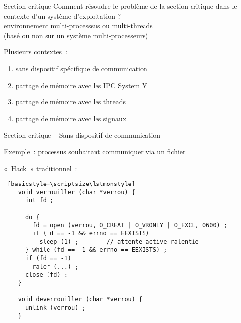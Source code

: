 

\begin {frame} {Section critique}
    Comment résoudre le problème de la section critique dans
    le contexte d'un système d'exploitation ? \\
    \implique environnement multi-processsus ou multi-threads \\
    (basé ou non sur un système multi-processeurs)

    \vspace* {3mm}
    Plusieurs contextes~:
    \begin {enumerate}
	\item sans dispositif spécifique de communication
	\item partage de mémoire avec les IPC System V
	\item partage de mémoire avec les threads
	\item partage de mémoire avec les signaux
    \end {enumerate}

\end {frame}

\begin {frame} [fragile] {Section critique -- Sans dispositif de communication}

    Exemple~: processus souhaitant communiquer via un fichier

    \vspace* {3mm}

    «~Hack~» traditionnel~:

    \begin {lstlisting} [basicstyle=\scriptsize\lstmonstyle]
    void verrouiller (char *verrou) {
      int fd ;

      do {
        fd = open (verrou, O_CREAT | O_WRONLY | O_EXCL, 0600) ;
        if (fd == -1 && errno == EEXISTS)
          sleep (1) ;        // attente active ralentie
      } while (fd == -1 && errno == EEXISTS) ;
      if (fd == -1)
        raler (...) ;
      close (fd) ;
    }

    void deverrouiller (char *verrou) {
      unlink (verrou) ;
    }
    \end{lstlisting}

\end{frame}

